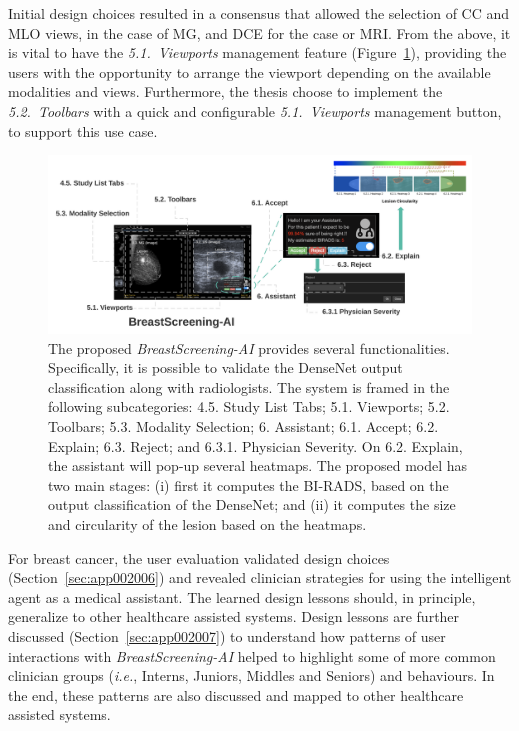 Initial design choices resulted in a consensus that allowed the selection of \ac{CC} and \ac{MLO} views, in the case of MG, 
and \ac{DCE} for the case or \ac{MRI}.
From the above, it is vital to have the \textit{5.1.~Viewports} management feature (Figure~\ref{fig:fig040}), providing the users with the opportunity to arrange the viewport depending on the available modalities and views.
Furthermore, the thesis choose to implement the \textit{5.2.~Toolbars} with a quick and configurable \textit{5.1.~Viewports} management button, to support this use case.

\begin{figure}[htbp]
\centering
\includegraphics[width=\textwidth]{images/fig040}
\caption{The proposed {\it BreastScreening-AI} provides several functionalities. Specifically, it is possible to validate the DenseNet output classification along with radiologists. The system is framed in the following subcategories: 4.5. Study List Tabs; 5.1. Viewports; 5.2. Toolbars; 5.3. Modality Selection; 6. Assistant; 6.1. Accept; 6.2. Explain; 6.3. Reject; and 6.3.1. Physician Severity. On 6.2. Explain, the assistant will pop-up several heatmaps. The proposed model has two main stages: (i)  first it computes the BI-RADS, based on the output classification of the DenseNet; and (ii) it computes the size and circularity of the lesion based on the heatmaps.}
\label{fig:fig040}
\end{figure}

For breast cancer, the user evaluation validated design choices (Section~\ref{sec:app002006}) and revealed clinician strategies for using the intelligent agent as a medical assistant.
The learned design lessons should, in principle, generalize to other healthcare assisted systems.
Design lessons are further discussed (Section~\ref{sec:app002007}) to understand how patterns of user interactions with {\it BreastScreening-AI} helped to highlight some of more common clinician groups ({\it i.e.}, Interns, Juniors, Middles and Seniors) and behaviours.
In the end, these patterns are also discussed and mapped to other healthcare assisted systems.

